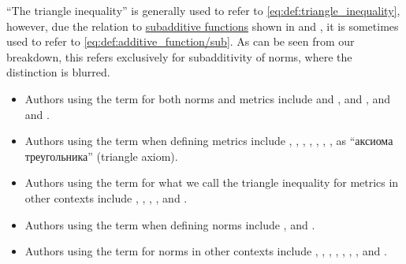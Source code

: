 \begin{remark}\label{rem:triangle_inequality_terminology}
  \enquote{The triangle inequality} is generally used to refer to \eqref{eq:def:triangle_inequality}, however, due the relation to \hyperref[def:additive_function/sub]{subadditive functions} shown in  and , it is sometimes used to refer to \eqref{eq:def:additive_function/sub}. As can be seen from our breakdown, this refers exclusively for subadditivity of norms, where the distinction is blurred.

  \begin{itemize}
    \item Authors using the term for both norms and metrics include
     and \cite[30]{Yoshida1980FunctionalAnalysis},
     and \cite[191]{WheedenZygmund2015MeasureAndIntegral},
     and
     and \cite[673]{Rotman2015AdvancedModernAlgebraPart1}.

    \item Authors using the term when defining metrics include
    ,
    ,
    ,
    ,
    ,
    ,
    ,
     as \enquote{аксиома треугольника} (triangle axiom).

    \item Authors using the term for what we call the triangle inequality for metrics in other contexts include
    ,
    ,
    ,
    ,
     and
    .

    \item Authors using the term when defining norms include
    ,
     and
    .

    \item Authors using the term for norms in other contexts include
    ,
    ,
    ,
    ,
    ,
    ,
    ,
     and
    .
  \end{itemize}
\end{remark}

